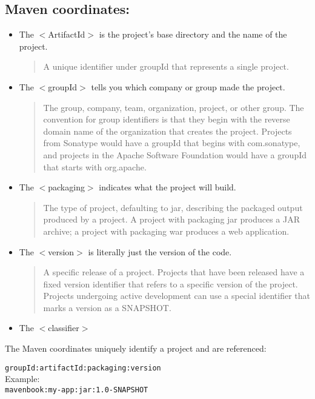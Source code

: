 \documentclass[12pt]{extarticle}
\theoremstyle{plain}
\theoremstyle{Definition}
\theoremstyle{Definition}
\theoremstyle{plain}
\begin{document}
	\subsection{Maven coordinates:}
		\begin{itemize}
			\item The $<$ArtifactId$>$ is the project's base directory and the name of the project. 
				\begin{quotation}
				A unique identifier under groupId that represents a single project.
				\end{quotation}			
			\item The $<$groupId$>$ tells you which company or group made the project. 
				\begin{quotation} 
				The group, company, team, organization, project, or other group. The convention for group identifiers is that they begin with the reverse domain name of the organization that creates the project. Projects from Sonatype would have a groupId that begins with com.sonatype, and projects in the Apache Software Foundation would have a groupId that starts with org.apache.
				\end{quotation}			
			\item The $<$packaging$>$ indicates what the project will build. 
				\begin{quotation}
				The type of project, defaulting to jar, describing the packaged output produced by a project. A project with packaging jar produces a JAR archive; a project with packaging war produces a web application. 				
				\end{quotation}
			\item The $<$version$>$ is literally just the version of the code. 
				\begin{quotation}
				A specific release of a project. Projects that have been released have a fixed version identifier that refers to a specific version of the project. Projects undergoing active development can use a special identifier that marks a version as a SNAPSHOT.
				\end{quotation}
			\item The $<$classifier$>$ 
		\end{itemize}
		The Maven coordinates uniquely identify a project and are referenced: 
		\begin{center}
			\verb|groupId:artifactId:packaging:version|  \\
			Example: \\ 
			\verb|mavenbook:my-app:jar:1.0-SNAPSHOT|
		\end{center}
\end{document}
